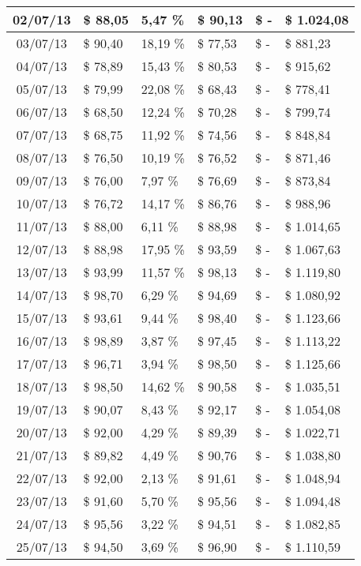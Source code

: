 \begin{small}
\begin{longtable}{|c|l|l|l|l|l|}
02/07/13 & \$ 88,05 & 5,47 \% & \$ 90,13 & \$ - & \$ 1.024,08 \\ \hline
03/07/13 & \$ 90,40 & 18,19 \% & \$ 77,53 & \$ - & \$ 881,23 \\ \hline
04/07/13 & \$ 78,89 & 15,43 \% & \$ 80,53 & \$ - & \$ 915,62 \\ \hline
05/07/13 & \$ 79,99 & 22,08 \% & \$ 68,43 & \$ - & \$ 778,41 \\ \hline
06/07/13 & \$ 68,50 & 12,24 \% & \$ 70,28 & \$ - & \$ 799,74 \\ \hline
07/07/13 & \$ 68,75 & 11,92 \% & \$ 74,56 & \$ - & \$ 848,84 \\ \hline
08/07/13 & \$ 76,50 & 10,19 \% & \$ 76,52 & \$ - & \$ 871,46 \\ \hline
09/07/13 & \$ 76,00 & 7,97 \% & \$ 76,69 & \$ - & \$ 873,84 \\ \hline
10/07/13 & \$ 76,72 & 14,17 \% & \$ 86,76 & \$ - & \$ 988,96 \\ \hline
11/07/13 & \$ 88,00 & 6,11 \% & \$ 88,98 & \$ - & \$ 1.014,65 \\ \hline
12/07/13 & \$ 88,98 & 17,95 \% & \$ 93,59 & \$ - & \$ 1.067,63 \\ \hline
13/07/13 & \$ 93,99 & 11,57 \% & \$ 98,13 & \$ - & \$ 1.119,80 \\ \hline
14/07/13 & \$ 98,70 & 6,29 \% & \$ 94,69 & \$ - & \$ 1.080,92 \\ \hline
15/07/13 & \$ 93,61 & 9,44 \% & \$ 98,40 & \$ - & \$ 1.123,66 \\ \hline
16/07/13 & \$ 98,89 & 3,87 \% & \$ 97,45 & \$ - & \$ 1.113,22 \\ \hline
17/07/13 & \$ 96,71 & 3,94 \% & \$ 98,50 & \$ - & \$ 1.125,66 \\ \hline
18/07/13 & \$ 98,50 & 14,62 \% & \$ 90,58 & \$ - & \$ 1.035,51 \\ \hline
19/07/13 & \$ 90,07 & 8,43 \% & \$ 92,17 & \$ - & \$ 1.054,08 \\ \hline
20/07/13 & \$ 92,00 & 4,29 \% & \$ 89,39 & \$ - & \$ 1.022,71 \\ \hline
21/07/13 & \$ 89,82 & 4,49 \% & \$ 90,76 & \$ - & \$ 1.038,80 \\ \hline
22/07/13 & \$ 92,00 & 2,13 \% & \$ 91,61 & \$ - & \$ 1.048,94 \\ \hline
23/07/13 & \$ 91,60 & 5,70 \% & \$ 95,56 & \$ - & \$ 1.094,48 \\ \hline
24/07/13 & \$ 95,56 & 3,22 \% & \$ 94,51 & \$ - & \$ 1.082,85 \\ \hline
25/07/13 & \$ 94,50 & 3,69 \% & \$ 96,90 & \$ - & \$ 1.110,59 \\ \hline

\end{longtable}
\end{small}
